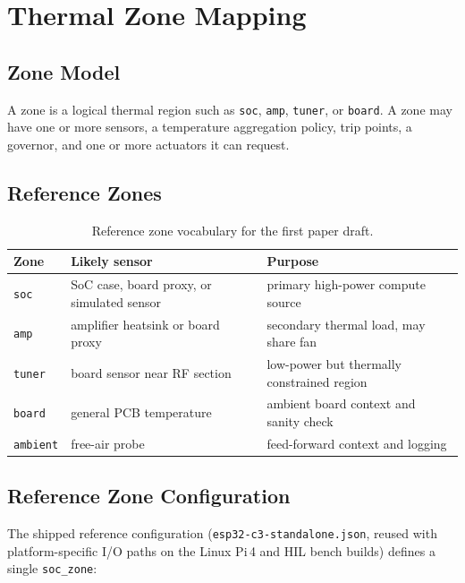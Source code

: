 \section{Thermal Zone Mapping}\label{sec:zone-mapping}

\subsection{Zone Model}

A zone is a logical thermal region such as \texttt{soc}, \texttt{amp}, \texttt{tuner}, or \texttt{board}. A zone may have one or more sensors, a temperature aggregation policy, trip points, a governor, and one or more actuators it can request.

\subsection{Reference Zones}

\begin{table}[h]
\centering
\begin{tabular}{p{}p{}p{}}
\toprule
\textbf{Zone} & \textbf{Likely sensor} & \textbf{Purpose} \\
\midrule
\texttt{soc} & SoC case, board proxy, or simulated sensor & primary high-power compute source \\
\texttt{amp} & amplifier heatsink or board proxy & secondary thermal load, may share fan \\
\texttt{tuner} & board sensor near RF section & low-power but thermally constrained region \\
\texttt{board} & general PCB temperature & ambient board context and sanity check \\
\texttt{ambient} & free-air probe & feed-forward context and logging \\
\bottomrule
\end{tabular}
\caption{Reference zone vocabulary for the first paper draft.}
\label{tab:reference-zones}
\end{table}

\subsection{Reference Zone Configuration}

The shipped reference configuration (\texttt{esp32-c3-standalone.json}, reused with platform-specific I/O paths on the Linux Pi\,4 and HIL bench builds) defines a single \texttt{soc\_zone}:

